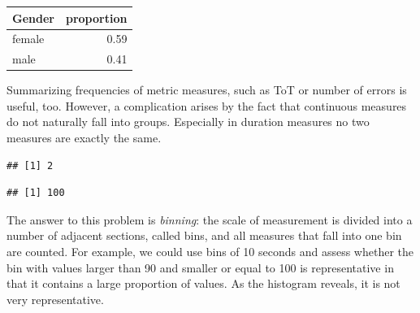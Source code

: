\documentclass[]{svmono}
\newenvironment{Shaded}{\begin{snugshade}}{\end{snugshade}}
\newcommand{\KeywordTok}[1]{\textcolor[rgb]{0.13,0.29,0.53}{\textbf{#1}}}
\newcommand{\OperatorTok}[1]{\textcolor[rgb]{0.81,0.36,0.00}{\textbf{#1}}}
\newcommand{\NormalTok}[1]{#1}
\begin{document}
\begin{tabular}{l|r}
\hline
Gender & proportion\\
\hline
female & 0.59\\
\hline
male & 0.41\\
\hline
\end{tabular}

Summarizing frequencies of metric measures, such as ToT or number of
errors is useful, too. However, a complication arises by the fact that
continuous measures do not naturally fall into groups. Especially in
duration measures no two measures are exactly the same.

\begin{Shaded}
\end{Shaded}

\begin{verbatim}
## [1] 2
\end{verbatim}

\begin{Shaded}
\end{Shaded}

\begin{verbatim}
## [1] 100
\end{verbatim}

The answer to this problem is \emph{binning}: the scale of measurement
is divided into a number of adjacent sections, called bins, and all
measures that fall into one bin are counted. For example, we could use
bins of 10 seconds and assess whether the bin with values larger than 90
and smaller or equal to 100 is representative in that it contains a
large proportion of values. As the histogram reveals, it is not very
representative.
\end{document}
